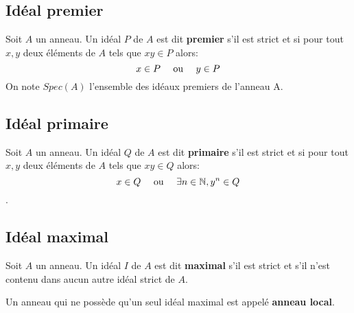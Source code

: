 \subsection{Idéal premier}
\begin{madefinition}
	Soit $A$ un anneau. Un idéal $P$ de $A$ est dit \textbf{premier} s'il est strict et si pour tout $x,y$ deux éléments de $A$ tels que $xy \in P$ alors: $$x \in P \text{ \quad ou \quad} y\in P$$
	On note $Spec(A)$  l'ensemble des idéaux premiers de l'anneau A. 
\end{madefinition}
\subsection{Idéal primaire}
\begin{madefinition}
	Soit $A$ un anneau. Un idéal $Q$ de $A$ est dit \textbf{primaire} s'il est strict et si pour tout $x,y$ deux éléments de $A$ tels que $xy \in Q$ alors: $$x \in Q \text{ \quad ou \quad} \exists n \in \mathbb{N}, y^{n} \in Q$$.
\end{madefinition}
\subsection{Idéal maximal}
\begin{madefinition}
	Soit $A$ un anneau. Un idéal $I$ de $A$ est dit \textbf{maximal} s'il est strict et s'il n'est contenu dans aucun autre idéal strict de $A$.
\end{madefinition}
\begin{maremarque}
	Un anneau qui ne possède qu'un seul idéal maximal est appelé \textbf{anneau local}.
\end{maremarque}
